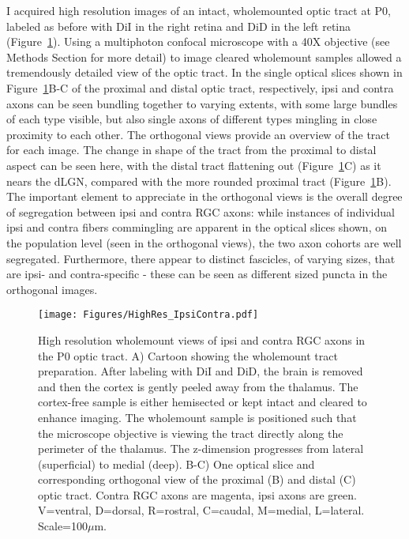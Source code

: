 I acquired high resolution images of an intact, wholemounted optic tract at P0, labeled as before with DiI in the right retina and DiD in the left retina (Figure~\ref{Figures/HighRes_IpsiContra}).
Using a multiphoton confocal microscope with a 40X objective (see Methods Section for more detail) to image cleared wholemount samples allowed a tremendously detailed view of the optic tract.
In the single optical slices shown in Figure~\ref{Figures/HighRes_IpsiContra}B-C of the proximal and distal optic tract, respectively, ipsi and contra axons can be seen bundling together to varying extents, with some large bundles of each type visible, but also single axons of different types mingling in close proximity to each other.
The orthogonal views provide an overview of the tract for each image.
The change in shape of the tract from the proximal to distal aspect can be seen here, with the distal tract flattening out (Figure~\ref{Figures/HighRes_IpsiContra}C) as it nears the dLGN, compared with the more rounded proximal tract (Figure~\ref{Figures/HighRes_IpsiContra}B).
The important element to appreciate in the orthogonal views is the overall degree of segregation between ipsi and contra RGC axons: while instances of individual ipsi and contra fibers commingling are apparent in the optical slices shown, on the population level (seen in the orthogonal views), the two axon cohorts are well segregated.
Furthermore, there appear to distinct fascicles, of varying sizes, that are ipsi- and contra-specific - these can be seen as different sized puncta in the orthogonal images.
\begin{figure}[hbtp]
    \begin{center}
        \texttt{[image: Figures/HighRes\_IpsiContra.pdf]}
        \caption[High resolution wholemount views of ipsi and contra RGC axons in the P0 optic tract.]
        {High resolution wholemount views of ipsi and contra RGC axons in the P0 optic tract.
		A) Cartoon showing the wholemount tract preparation.
		After labeling with DiI and DiD, the brain is removed and then the cortex is gently peeled away from the thalamus.
		The cortex-free sample is either hemisected or kept intact and cleared to enhance imaging.
		The wholemount sample is positioned such that the microscope objective is viewing the tract directly along the perimeter of the thalamus.
		The z-dimension progresses from lateral (superficial) to medial (deep).
		B-C) One optical slice and corresponding orthogonal view of the proximal (B) and distal (C) optic tract.
		Contra RGC axons are magenta, ipsi axons are green.
		V=ventral, D=dorsal, R=rostral, C=caudal, M=medial, L=lateral.
		Scale=100$\mu$m.
		}
        \label{Figures/HighRes_IpsiContra}
    \end{center}
\end{figure}

